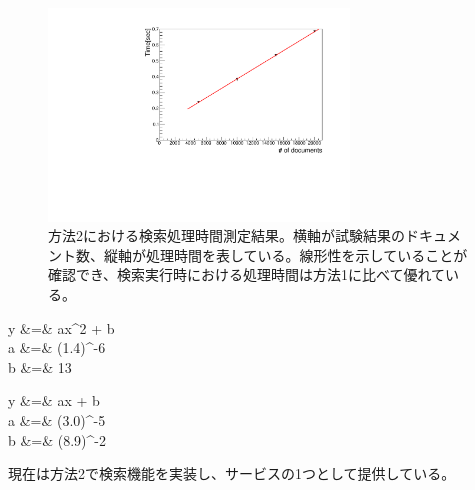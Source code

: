 \begin{figure}[bpt]
  \begin{center}
  \includegraphics[width=8cm,angle=270]{./result_mongo_collection_search.pdf}
  \caption[方法2における検索処理時間測定結果]{方法2における検索処理時間測定結果。横軸が試験結果のドキュメント数、縦軸が処理時間を表している。線形性を示していることが確認でき、検索実行時における処理時間は方法1に比べて優れている。}
  \label{searching_time}
  \end{center}
\end{figure}

\bbb
y &=&  ax^2 + b \\
\label{function_python_list}
a &=& (1.4)^{-6} \nonumber \\
b &=& 13 \nonumber
\eee

\bbb
y &=& ax + b \\
\label{function_mongo_collection}
a &=& (3.0)^{-5} \nonumber \\
b &=& (8.9)^{-2} \nonumber
\eee

現在は方法2で検索機能を実装し、サービスの1つとして提供している。



